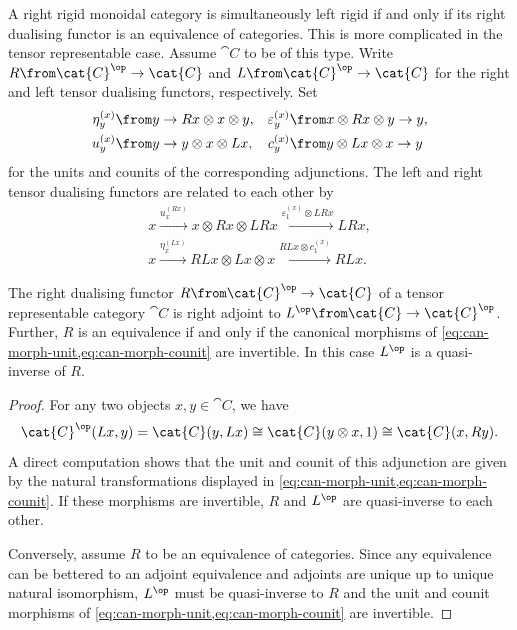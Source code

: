 A right rigid monoidal category is simultaneously left rigid if and only if its right dualising functor is an equivalence of categories.
This is more complicated in the tensor representable case.
Assume \(\cat{C}\) to be of this type.
Write \(R \from\cat{C}^{\op} \to\cat{C}\) and \(L \from\cat{C}^{\op} \to\cat{C}\) for the right and left tensor dualising functors, respectively.
Set
\begin{align*}
  \eta^{(x)}_y &\from y \to Rx \otimes x \otimes y, & \varepsilon^{(x)}_y&\from x \otimes Rx \otimes y \to y ,\\
  u^{(x)}_y & \from y \to y \otimes x \otimes Lx, & c^{(x)}_{y} &\from y \otimes Lx \otimes x \to y
\end{align*}
for the units and counits of the corresponding adjunctions.
The left and right tensor dualising functors are related to each other by
\begin{align}
  x \xrightarrow{u^{(Rx)}_x} x \otimes Rx \otimes LRx \xrightarrow{\varepsilon^{(x)}_1 \otimes LRx}LRx, \label{eq:can-morph-unit} \\
  x \xrightarrow{\eta^{(Lx)}_x} RLx \otimes Lx \otimes x \xrightarrow{RLx \otimes c^{(x)}_1}RLx. \label{eq:can-morph-counit}
\end{align}

\begin{proposition}\label{prop:trep-criteria}
  The right dualising functor \(R\from\cat{C}^{\op} \to\cat{C}\)
  of a tensor representable category \(\cat{C}\)
  is right adjoint to \(L^{\op}\from\cat{C}\to\cat{C}^{\op}\).
  Further, \(R\) is an equivalence if and only if
  the canonical morphisms of \cref{eq:can-morph-unit,eq:can-morph-counit} are invertible.
  In this case \(L^{\op}\) is a quasi-inverse of \(R\).
\end{proposition}
\begin{proof}
  For any two objects \(x,y \in\cat{C}\), we have
  \[
    \cat{C}^{\op}(Lx, y) =  \cat{C}(y, Lx) \cong  \cat{C} (y \otimes x, 1) \cong  \cat{C}(x,  Ry).
  \]
  A direct computation shows that the unit and counit of this adjunction are given by the natural transformations
  displayed in \cref{eq:can-morph-unit,eq:can-morph-counit}.
  If these morphisms are invertible, \(R\) and \(L^{\op}\) are quasi-inverse to each other.

  Conversely, assume \(R\) to be an equivalence of categories.
  Since any equivalence can be bettered to an adjoint equivalence
  and adjoints are unique up to unique natural isomorphism,
  \(L^{\op}\) must be quasi-inverse to \(R\)
  and the unit and counit morphisms of \cref{eq:can-morph-unit,eq:can-morph-counit} are invertible.
\end{proof}

